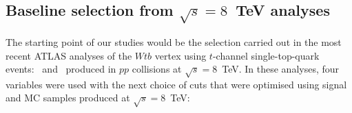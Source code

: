 

\subsection{Baseline selection from \boldmath$\sqrt{s} = 8$~TeV analyses}


The starting point of our studies would be the selection carried out in the most recent ATLAS analyses of the $Wtb$ vertex using $t$-channel single-top-quark events:~\cite{Probing} and~\cite{Aaboud:2017yqf} produced in $pp$ collisions at $\sqrt{s} = 8$~TeV. In these analyses, four variables were used with the next choice of cuts that were optimised using signal and MC samples produced at $\sqrt{s} = 8$~TeV:


